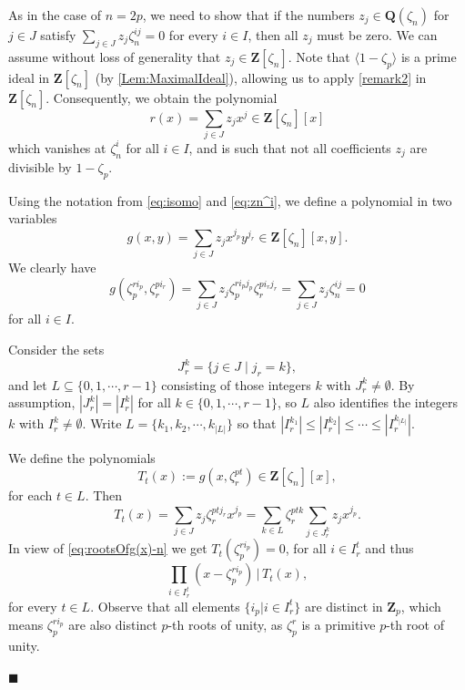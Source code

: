 \documentclass[a4paper,12pt,reqno]{amsart}
\newenvironment{proofofB}{{\bf {Proof of Theorem \ref{Thm:B}.} }}{\hfill $\blacksquare$ \\}
\def\Z{\mathbf{Z}}
\def\Q{\mathbf{Q}}
\begin{document}
\begin{proofofB}
As in the case of $n=2p$, we need to show that if the numbers $z_j \in \Q(\zeta_n)$ for $j \in J$ satisfy $\sum_{j \in J} z_j \zeta_n^{ij} = 0$ for every $i \in I$, then all $z_j$ must be zero. We can assume without loss of generality that $z_j \in \Z[\zeta_n]$. Note that $\langle 1 - \zeta_p \rangle$ is a prime ideal in $\Z[\zeta_n]$ (by \autoref{Lem:MaximalIdeal}), allowing us to apply \autoref{remark2} in $\Z[\zeta_n]$. Consequently, we obtain the polynomial 
\begin{equation}\label{eq:r(x)-n}
r(x) = \sum_{j \in J} z_j x^{j} \in \Z[\zeta_n][x]
\end{equation}
which vanishes at $\zeta_n^i$ for all $i \in I$, and is such that not all coefficients $z_j$ are  divisible by $1 - \zeta_p$.

Using the notation from \eqref{eq:isomo} and \eqref{eq:zn^i}, we define a polynomial in two variables 
\begin{equation}\label{eq:g(x)-n}
g(x,y) = \sum_{j \in J }z_jx^{j_p}y^{j_r}  \in \Z[\zeta_n][x,y]. 
\end{equation}
We clearly have 
\begin{equation}\label{eq:rootsOfg(x)-n}
g(\zeta_p^{ri_p},\zeta_r^{pi_r}) = \sum_{j \in J }z_j \zeta_p^{ri_pj_p}\zeta_r^{pi_rj_r} = \sum_{j \in J }z_j \zeta_n^{ij}= 0 
\end{equation}
for all $i \in I$.

Consider the sets 
\begin{equation}
  J_r^k = \{ j \in J \mid j_r = k  \},    
\end{equation}
and let  $L \subseteq \{ 0, 1, \cdots, r-1\}$ consisting  of those integers $k$ with $J_r^k \neq \emptyset$. 
By assumption, $|J_r^k|= |I_r^k|$ for all $k \in \{0, 1, \cdots, r-1\}$, so $L$ also identifies  the integers $k$ with $I_r^k \neq \emptyset$. 
Write $L = \{ k_1, k_2,  \cdots, k_{|L|} \}$ so that 
$|I_r^{k_1}| \leq |I_r^{k_2}| \leq \cdots \leq |I_r^{k_{|L|}}|$. 


We define the polynomials  
\[
T_t(x) := g(x, \zeta_r^{pt}) \in \Z[\zeta_n][x],
\]  
for each  $t \in L$. Then  
\[
T_t(x) = \sum_{j \in J} z_j  \zeta_r^{ptj_r} x^{j_p} = \sum_{k \in L} \zeta_r^{ptk} \sum_{j \in J_r^k} z_j x^{j_p}. 
\]  
In view of \eqref{eq:rootsOfg(x)-n} we get $
T_t(\zeta_p^{ri_p})= 0$, 
for all $i \in I_r^t$ and thus 
\begin{equation}\label{eq:dividesT}
\prod_{i \in I_r^t} (x- \zeta_p^{ri_p}) \, \big|  \, T_t(x), 
\end{equation}
for every $t  \in L$. Observe that all elements $\{ i_p | i \in I_r^t \}$ are distinct in $\Z_p$, which means $\zeta_p^{ri_p}$ are also distinct $p$-th roots of unity, as $\zeta_p^r$ is a primitive $p$-th root of unity.


\end{proofofB}
\end{document}
